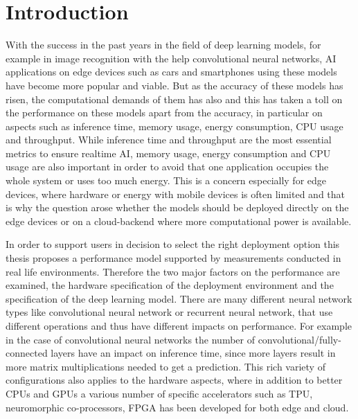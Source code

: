\chapter{Introduction}



With the success in the past years in the field of deep learning models, for example in image recognition with the help convolutional neural networks, AI applications on edge devices such as cars and smartphones using these models have become more popular and viable.
But as the accuracy of these models has risen, the computational demands of them has also and this has taken a toll on the performance on these models apart from the accuracy, in particular on aspects such as inference time, memory usage, energy consumption, CPU usage and throughput. 
While inference time and throughput are the most essential metrics to ensure realtime AI, memory usage, energy consumption and CPU usage are also important in order to avoid that one application occupies the whole system or uses too much energy.
This is a concern especially for edge devices, where hardware or energy with mobile devices is often limited and that is why the question arose whether the models should be deployed directly on the edge devices or on a cloud-backend where more computational power is available. 

In order to support users in decision to select the right deployment option this thesis proposes a performance model supported by measurements conducted in real life environments.
Therefore the two major factors on the performance are examined, the hardware specification of the deployment environment and the specification of the deep learning model. 
There are many different neural network types like convolutional neural network or recurrent neural network, that use different operations and thus have different impacts on performance.
For example in the case of convolutional neural networks the number of convolutional/fully-connected layers have an impact on inference time, since more layers result in more matrix multiplications needed to get a prediction.
This rich variety of configurations also applies to the hardware aspects, where in addition to better CPUs and GPUs a various number of specific accelerators such as TPU, neuromorphic co-processors, FPGA has been developed for both edge and cloud.




